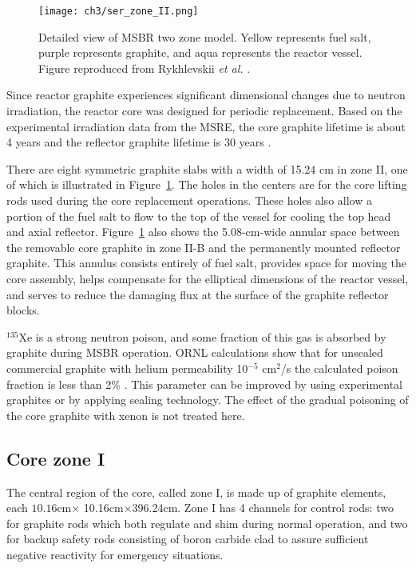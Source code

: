 \begin{figure}[t!] %
	\texttt{[image: ch3/ser\_zone\_II.png]}
	\caption{Detailed view of \gls{MSBR} two zone model. 
		Yellow represents fuel salt, purple represents graphite, and aqua 
		represents the reactor vessel. Figure reproduced from Rykhlevskii 
		\emph{et al.} \cite{rykhlevskii_modeling_2019}.}
	\label{fig:serpent_zoneII}
\end{figure}

Since reactor graphite experiences significant dimensional changes due to 
neutron irradiation, the reactor core was designed for periodic replacement. 
Based on the experimental irradiation data from the \gls{MSRE}, the core 
graphite lifetime is about 4 years and the reflector graphite lifetime is 30 
years \cite{robertson_conceptual_1971}.

There are eight symmetric graphite slabs with a width of 15.24 cm in zone II, 
one of which is illustrated in Figure~\ref{fig:serpent_zoneII}. The holes in 
the centers are for the core lifting rods used during the core replacement 
operations. These holes also allow a portion of the fuel salt to flow to the 
top of the vessel for cooling the top head and axial reflector.  
Figure~\ref{fig:serpent_zoneII} also shows the 5.08-cm-wide annular 
space between the removable core graphite in zone II-B and the permanently 
mounted reflector graphite. This annulus consists entirely of fuel salt, 
provides space for moving the core assembly, helps compensate for the 
elliptical dimensions of the reactor vessel, and serves to reduce the damaging 
flux at the surface of the graphite reflector blocks. 

$^{135}$Xe is a strong neutron poison, and some fraction of this gas is 
absorbed by graphite during \gls{MSBR} operation. ORNL calculations show 
that for unsealed commercial graphite with helium permeability 10$^{-5}$ 
cm$^2$/s the calculated poison fraction is less than 2\%  
\cite{robertson_conceptual_1971}.  This parameter can be improved by using 
experimental graphites or by applying sealing technology. The effect of the 
gradual poisoning of the core graphite with xenon is not treated here.

\subsection{Core zone I}
The central region of the core, called zone I, is made up of graphite 
elements, each $10.16$cm$\times$ 10.16cm$\times$396.24cm. Zone I has 4 
channels for control rods: two for graphite rods which both regulate and shim 
during normal operation, and two for backup safety rods consisting of boron 
carbide clad to assure sufficient negative reactivity for emergency situations.


